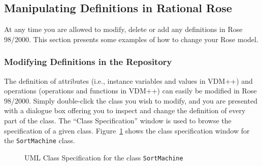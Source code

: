 \documentclass[\pformat,12pt]{article}
\newcommand{\vdmpp}{VDM++}
\newcommand{\rose}{Rose 98/2000}
\begin{document}
\subsection{Manipulating Definitions in Rational Rose}
\label{manipulate}
  
At any time you are allowed to modify, delete or add any definitions in \rose{}. 
This section presents some examples of how to change your Rose model.

\subsubsection*{Modifying Definitions in the Repository}
  
The definition of attributes (i.e., instance variables and values
in \vdmpp{}) and operations (operations and functions
in \vdmpp{}) can easily be modified in \rose{}. Simply double-click
the class you wish to modify, and you are presented with a dialogue
box offering you to inspect and change the definition of every part of
the class.  The ``Class Specification'' window is used to browse the
specification of a given class. Figure~\ref{fig:classspecification}
shows the class specification window for the {\tt SortMachine} class.

\begin{figure}[htb]
\begin{center}
\mbox{}
\caption{UML Class Specification for the class {\tt SortMachine}\label{fig:classspecification}}
\end{center}
\end{figure}
\end{document}
